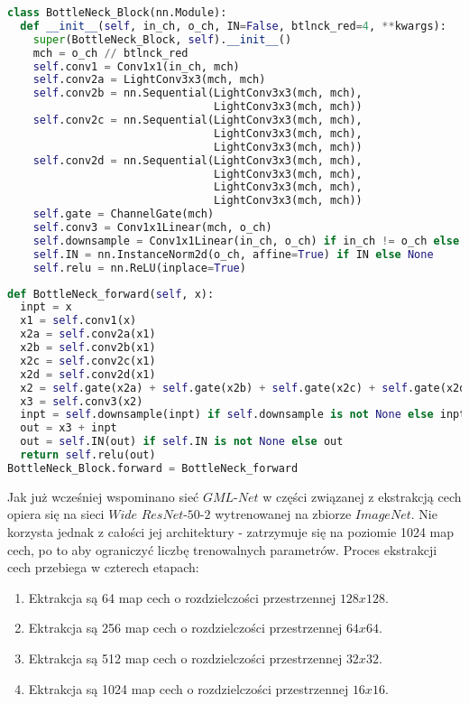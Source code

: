 \cell
\begin{lstlisting}[name=Rozdzial3.1, language=Python]
class BottleNeck_Block(nn.Module):
  def __init__(self, in_ch, o_ch, IN=False, btlnck_red=4, **kwargs):
    super(BottleNeck_Block, self).__init__()
    mch = o_ch // btlnck_red
    self.conv1 = Conv1x1(in_ch, mch)
    self.conv2a = LightConv3x3(mch, mch)
    self.conv2b = nn.Sequential(LightConv3x3(mch, mch), 
                                LightConv3x3(mch, mch))
    self.conv2c = nn.Sequential(LightConv3x3(mch, mch), 
                                LightConv3x3(mch, mch),
                                LightConv3x3(mch, mch))
    self.conv2d = nn.Sequential(LightConv3x3(mch, mch), 
                                LightConv3x3(mch, mch),
                                LightConv3x3(mch, mch), 
                                LightConv3x3(mch, mch))
    self.gate = ChannelGate(mch)
    self.conv3 = Conv1x1Linear(mch, o_ch)
    self.downsample = Conv1x1Linear(in_ch, o_ch) if in_ch != o_ch else None
    self.IN = nn.InstanceNorm2d(o_ch, affine=True) if IN else None
    self.relu = nn.ReLU(inplace=True)
\end{lstlisting}


\cell
\begin{lstlisting}[name=Rozdzial3.1, language=Python]
def BottleNeck_forward(self, x):
  inpt = x
  x1 = self.conv1(x)
  x2a = self.conv2a(x1)
  x2b = self.conv2b(x1)
  x2c = self.conv2c(x1)
  x2d = self.conv2d(x1)
  x2 = self.gate(x2a) + self.gate(x2b) + self.gate(x2c) + self.gate(x2d)
  x3 = self.conv3(x2)
  inpt = self.downsample(inpt) if self.downsample is not None else inpt
  out = x3 + inpt
  out = self.IN(out) if self.IN is not None else out
  return self.relu(out)
BottleNeck_Block.forward = BottleNeck_forward
\end{lstlisting}
\vspace{0.5cm}

\cell
Jak już wcześniej wspominano sieć $\textit{GML-Net}$ w części związanej z ekstrakcją cech opiera się na sieci $\textit{Wide ResNet-50-2}$ wytrenowanej na zbiorze $\textit{ImageNet}$. Nie korzysta jednak z całości jej architektury - zatrzymuje się na poziomie 1024 map cech, po to aby ograniczyć liczbę trenowalnych parametrów. Proces ekstrakcji cech przebiega w czterech etapach: 

\begin{enumerate}
  \item Ektrakcja są 64 map cech o rozdzielczości przestrzennej $\textit{128x128}$.
  \item Ektrakcja są 256 map cech o rozdzielczości przestrzennej $\textit{64x64}$.
  \item Ektrakcja są 512 map cech o rozdzielczości przestrzennej $\textit{32x32}$.
  \item Ektrakcja są 1024 map cech o rozdzielczości przestrzennej $\textit{16x16}$.

\end{enumerate}

